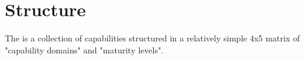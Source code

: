 \chapter{Structure}\label{ch:ekg-mm-structure}

The  is a collection of capabilities structured in a relatively simple 4x5 matrix of
"capability domains" and "maturity levels".








